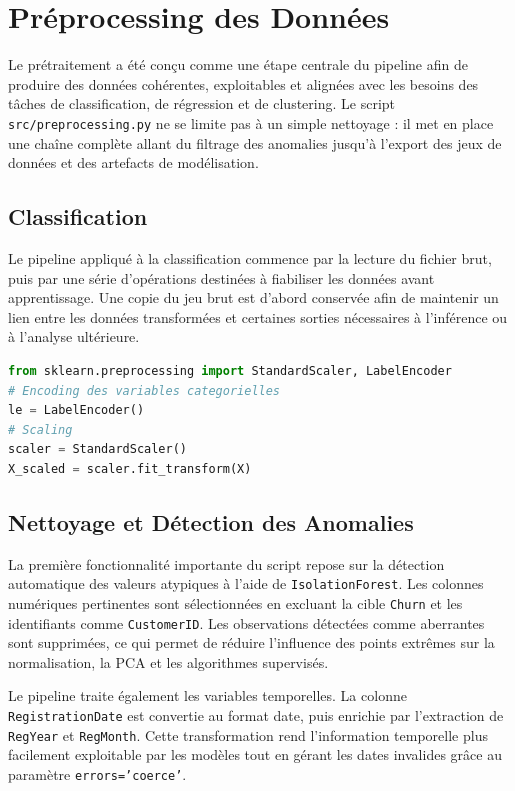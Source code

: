 \documentclass[11pt,a4paper]{article}
\begin{document}
\clearpage

\section{Préprocessing des Données}

Le prétraitement a été conçu comme une étape centrale du pipeline afin de produire des données cohérentes, exploitables et alignées avec les besoins des tâches de classification, de régression et de clustering. Le script \texttt{src/preprocessing.py} ne se limite pas à un simple nettoyage : il met en place une chaîne complète allant du filtrage des anomalies jusqu'à l'export des jeux de données et des artefacts de modélisation.

\subsection{Classification}
Le pipeline appliqué à la classification commence par la lecture du fichier brut, puis par une série d'opérations destinées à fiabiliser les données avant apprentissage. Une copie du jeu brut est d'abord conservée afin de maintenir un lien entre les données transformées et certaines sorties nécessaires à l'inférence ou à l'analyse ultérieure.

\begin{lstlisting}[language=Python, caption=Préprocessing classification]
from sklearn.preprocessing import StandardScaler, LabelEncoder
# Encoding des variables categorielles
le = LabelEncoder()
# Scaling
scaler = StandardScaler()
X_scaled = scaler.fit_transform(X)
\end{lstlisting}

\subsection{Nettoyage et Détection des Anomalies}
La première fonctionnalité importante du script repose sur la détection automatique des valeurs atypiques à l'aide de \texttt{IsolationForest}. Les colonnes numériques pertinentes sont sélectionnées en excluant la cible \texttt{Churn} et les identifiants comme \texttt{CustomerID}. Les observations détectées comme aberrantes sont supprimées, ce qui permet de réduire l'influence des points extrêmes sur la normalisation, la PCA et les algorithmes supervisés.

Le pipeline traite également les variables temporelles. La colonne \texttt{RegistrationDate} est convertie au format date, puis enrichie par l'extraction de \texttt{RegYear} et \texttt{RegMonth}. Cette transformation rend l'information temporelle plus facilement exploitable par les modèles tout en gérant les dates invalides grâce au paramètre \texttt{errors='coerce'}.
\end{document}
